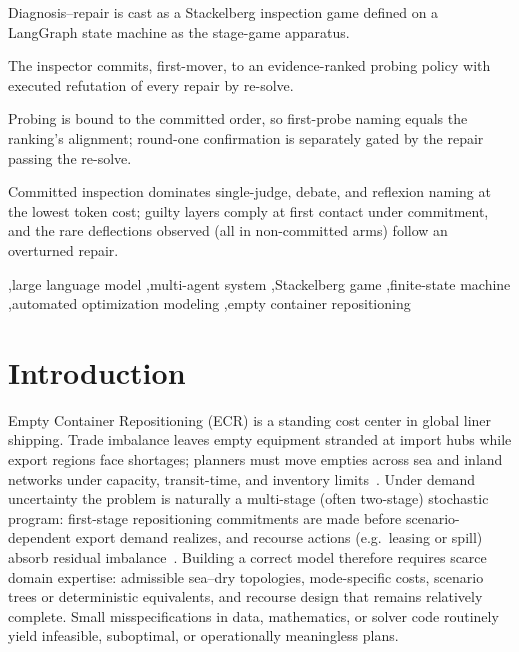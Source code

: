 \documentclass[a4paper,fleqn]{cas-sc}
\begin{document}
\begin{highlights}
\item Diagnosis--repair is cast as a Stackelberg inspection game defined on a LangGraph state machine as the stage-game apparatus.
\item The inspector commits, first-mover, to an evidence-ranked probing policy with executed refutation of every repair by re-solve.
\item Probing is bound to the committed order, so first-probe naming equals the ranking's alignment; round-one confirmation is separately gated by the repair passing the re-solve.
\item Committed inspection dominates single-judge, debate, and reflexion naming at the lowest token cost; guilty layers comply at first contact under commitment, and the rare deflections observed (all in non-committed arms) follow an overturned repair.
\end{highlights}

\begin{keywords}
\sep large language model
\sep multi-agent system
\sep Stackelberg game
\sep finite-state machine
\sep automated optimization modeling
\sep empty container repositioning
\end{keywords}

\maketitle

\section{Introduction}
\label{sec:intro}

Empty Container Repositioning (ECR) is a standing cost center in global
liner shipping. Trade imbalance leaves empty equipment stranded at import
hubs while export regions face shortages; planners must move empties across
sea and inland networks under capacity, transit-time, and inventory
limits~\citep{poiani2024ecr,wang2025ecrslot}. Under demand uncertainty the
problem is naturally a multi-stage (often two-stage) stochastic program:
first-stage repositioning commitments are made before scenario-dependent
export demand realizes, and recourse actions (e.g.\ leasing or spill) absorb
residual imbalance~\citep{poiani2024ecr,cai2025ecrjoint}. Building a
correct model therefore requires scarce domain expertise: admissible
sea--dry topologies, mode-specific costs, scenario trees or deterministic
equivalents, and recourse design that remains relatively complete. Small
misspecifications in data, mathematics, or solver code routinely yield
infeasible, suboptimal, or operationally meaningless plans.
\end{document}
